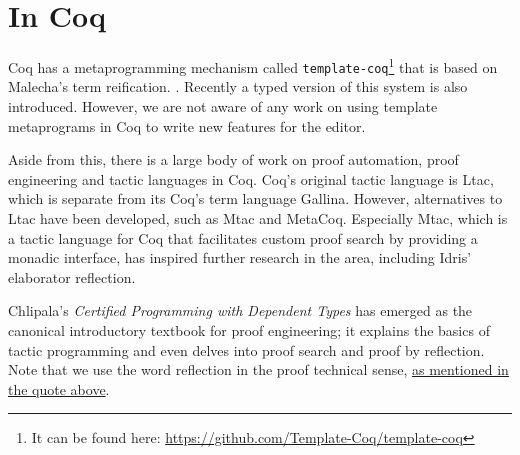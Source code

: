 \section{In Coq}

Coq has a metaprogramming mechanism called
\texttt{template-coq}\footnote{It can be found here:
\url{https://github.com/Template-Coq/template-coq}} that is based on
Malecha's term reification. \cite{malecha-phd}. Recently a typed
version of this system is also introduced. \cite{typed-template-coq}
However, we are not aware of any work on using template metaprograms in Coq to
write new features for the editor.

Aside from this, there is a large body of work on proof automation, proof
engineering and tactic languages in Coq.  Coq's original tactic language is
Ltac\cite{ltac}, which is separate from its Coq's term language Gallina.
However, alternatives to Ltac have been developed, such as Mtac\cite{mtac} and
MetaCoq\cite{metacoq}.  Especially Mtac\cite{mtac}, which is a tactic language
for Coq that facilitates custom proof search by providing a monadic interface,
has inspired further research in the area, including Idris' elaborator
reflection.\cite{elabref}

Chlipala's \emph{Certified Programming with Dependent Types}\cite{cpdt} has
emerged as the canonical introductory textbook for proof engineering; it
explains the basics of tactic programming and even delves into proof search and
proof by reflection. Note that we use the word reflection in the proof
technical sense, \hyperref[quote:reflection]{as mentioned in the quote above}.
